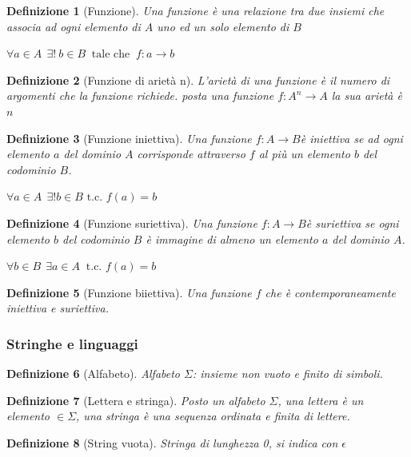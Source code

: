 \documentclass[a4paper]{article}
\newtheorem*{definition}{Definizione}
\begin{document}
\begin{definition}[Funzione]Una funzione è una relazione tra due insiemi che associa ad ogni elemento di $A$ uno ed un solo elemento di $B$
\begin{center}$\forall a \in A \ \ \exists  ! \ b \in B \ \mbox{ tale che } \ f:a\to b$\end{center}
\end{definition}
\begin{definition}[Funzione  di arietà n]L'arietà di una funzione è il numero di argomenti che la funzione richiede. posta una funzione $f : A^{n} \rightarrow A$ la sua arietà è $n$ 
\end{definition}
\begin{definition}[Funzione iniettiva]Una funzione $f : A \rightarrow B $è iniettiva se ad ogni elemento $a$ del dominio $A$ corrisponde attraverso $f$ al più un elemento $b$ del codominio $B$.
	\begin{center}$\forall a\in A\ \ \exists! b\in B \mbox{ t.c. }f(a)=b$\end{center}
\end{definition}
\begin{definition}[Funzione suriettiva]Una funzione $f : A \rightarrow B $è suriettiva se ogni elemento $b$ del codominio $B$ è immagine di almeno un elemento $a$ del dominio $A$.
	\begin{center}$\forall b\in B\ \ \exists a\in A\ \mbox{ t.c. }f(a)=b$\end{center}
\end{definition}
\begin{definition}[Funzione biiettiva]Una funzione $f$ che è contemporaneamente iniettiva e suriettiva.
\end{definition}

\subsubsection{Stringhe e linguaggi}

\begin{definition}[Alfabeto]Alfabeto $\Sigma$: insieme non vuoto e finito di simboli.
\end{definition}

\begin{definition}[Lettera e stringa]Posto un alfabeto $\Sigma$, una lettera è un elemento $\in \Sigma$, una stringa è una sequenza ordinata e finita di lettere.
\end{definition}

\begin{definition}[String vuota]Stringa di lunghezza 0, si indica con $\epsilon$
\end{definition}
\end{document}
